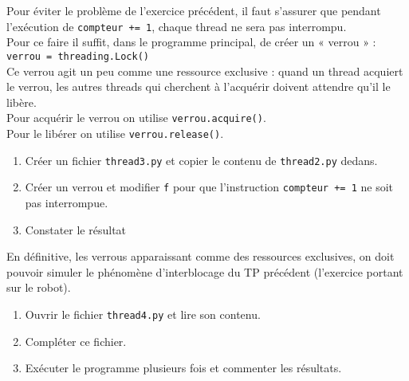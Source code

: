 \documentclass[12pt,a4paper,article,english,firamath]{nsi}
\begin{document}
\begin{exercice}[]
Pour éviter le problème de l'exercice précédent, il faut s'assurer que pendant l'exécution de \texttt{compteur += 1}, chaque thread ne sera pas interrompu.\\

Pour ce faire il suffit, dans le programme principal, de créer un « verrou » :\\
\texttt{verrou = threading.Lock()}\\
Ce verrou agit un peu comme une ressource exclusive : quand un thread acquiert le verrou, les autres threads qui cherchent à l'acquérir doivent attendre qu'il le libère.\\
Pour acquérir le verrou on utilise \texttt{verrou.acquire()}.\\
Pour le libérer on utilise \texttt{verrou.release()}.\\
\begin{enumerate}
	\item 	Créer un fichier \texttt{thread3.py} et copier le contenu de \texttt{thread2.py} dedans.
	\item 	Créer un verrou et modifier \texttt{f} pour que l'instruction \texttt{compteur += 1} ne soit pas interrompue.
    \item 	Constater le résultat
\end{enumerate}
\end{exercice}

\begin{exercice}[]
En définitive, les verrous apparaissant comme des ressources exclusives, on doit pouvoir simuler le phénomène d'interblocage du TP précédent (l'exercice portant sur le robot).
\begin{enumerate}
	\item 	Ouvrir le fichier \texttt{thread4.py} et lire son contenu.
	\item 	Compléter ce fichier.
    \item 	Exécuter le programme plusieurs fois et commenter les résultats.
\end{enumerate}
\end{exercice}
\end{document}
